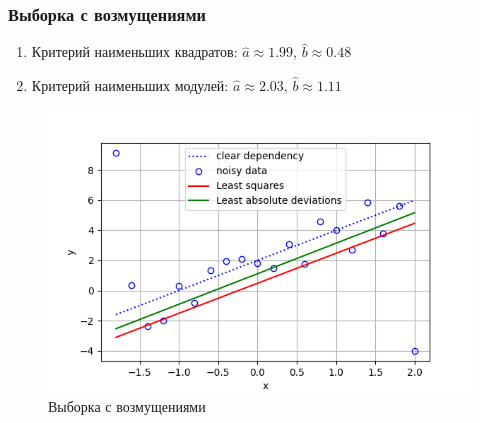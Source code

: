 	\subsubsection{Выборка с возмущениями}
		\begin{enumerate}
			\item{Критерий наименьших квадратов:}
			$\hat{a}\approx 1.99$, $\hat{b}\approx 0.48$
			\item{Критерий наименьших модулей:}
			$\hat{a}\approx 2.03$, $\hat{b}\approx 1.11$
		\end{enumerate}
		\begin{figure}[H]
			\centering
			\includegraphics{part_linear_regression/figures/ends_error}
			\caption{Выборка с возмущениями}
			\label{w_pert}
		\end{figure}